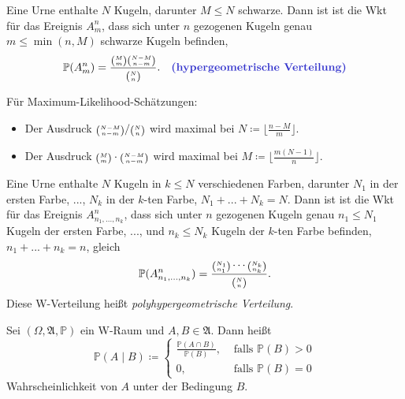 \documentclass{cheat-sheet}
\newcommand{\Alg}{\mathfrak{A}} %
\renewcommand{\P}{\mathbb{P}}
\let\myBinom\binom
\renewcommand{\binom}[2]{\mathsmaller{\myBinom{#1}{#2}}}
\begin{document}




\begin{modell}
  Eine Urne enthalte $N$ Kugeln, darunter $M \leq N$ schwarze. Dann ist ist die Wkt für das Ereignis $A^n_m$, dass sich unter $n$ gezogenen Kugeln genau $m \leq \min(n, M)$ schwarze Kugeln befinden,
  \[ \P(A^n_m) = \frac{\binom{M}{m} \binom{N - M}{n - m}}{\binom{N}{n}}. \quad \text{\emph{(hypergeometrische Verteilung)}} \]
\end{modell}


\begin{bem}
  Für Maximum-Likelihood-Schätzungen:
  \begin{itemize}
    \item Der Ausdruck $\binom{N-M}{n-m} / \binom{N}{n}$ wird maximal bei $N \coloneqq \lfloor \tfrac{n-M}{m} \rfloor$.
    \item Der Ausdruck $\binom{M}{m} \cdot \binom{N-M}{n-m}$ wird maximal bei $M \coloneqq \lfloor \tfrac{m (N-1)}{n} \rfloor$.
  \end{itemize}
\end{bem}


\begin{modell}
  Eine Urne enthalte $N$ Kugeln in $k \leq N$ verschiedenen Farben, darunter $N_1$ in der ersten Farbe, ..., $N_k$ in der $k$-ten Farbe, $N_1 + ... + N_k = N$. Dann ist ist die Wkt für das Ereignis $A^n_{n_1,...,n_k}$, dass sich unter $n$ gezogenen Kugeln genau $n_1 \leq N_1$ Kugeln der ersten Farbe, ..., und $n_k \leq N_k$ Kugeln der $k$-ten Farbe befinden, $n_1 + ... + n_k = n$, gleich
  \[ \P(A^n_{n_1, ..., n_k}) = \frac{\binom{N_1}{n_1} \cdots \binom{N_k}{n_k}}{\binom{N}{n}}. \]
  Diese W-Verteilung heißt \emph{polyhypergeometrische Verteilung}.
\end{modell}



\begin{defn}
  Sei $(\Omega, \Alg, \P)$ ein W-Raum und $A, B \in \Alg$. Dann heißt
  \[ \P(A \mid B) \coloneqq \begin{cases} \tfrac{\P(A \cap B)}{\P(B)}, & \text{ falls } \P(B) > 0 \\
  0, & \text{ falls } \P(B) = 0 \end{cases} \]
  Wahrscheinlichkeit von $A$ unter der Bedingung $B$.
\end{defn}
\end{document}
